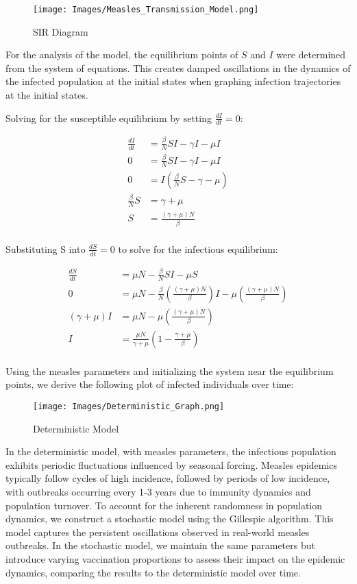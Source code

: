 \documentclass[12pt]{article}
\begin{document}
\begin{figure}[H]
  \centering
  \texttt{[image: Images/Measles\_Transmission\_Model.png]}
   \caption{SIR Diagram} 
\label{fig:example}
\end{figure}

For the analysis of the model, the equilibrium points of \(S\) and \(I\) were determined from the system of equations. This creates damped oscillations in the dynamics of the infected population at the initial states when graphing infection trajectories at the initial states. 

Solving for the susceptible equilibrium by setting \(\frac{dI}{dt} = 0\):

    \begin{align*}
      \frac{dI}{dt} &= \frac{\beta}{N} SI - \gamma I - \mu I \\ 
      0 &= \frac{\beta}{N} SI - \gamma I - \mu I \\ 
      0 &= I( \frac{\beta}{N} S - \gamma - \mu ) \\ 
       \frac{\beta}{N} S &=  \gamma + \mu\\ 
       S &=  \frac{(\gamma + \mu)N}{\beta} \\
    \end{align*}
    
Substituting S into \(\frac{dS}{dt} = 0\) to solve for the infectious equilibrium:
	
	\begin{align*}
	\frac{dS}{dt} &= \mu N -\frac{\beta}{N} SI - \mu S \\ 
	0 &= \mu N -\frac{\beta}{N} (\frac{(\gamma + \mu)N}{\beta} )I - \mu (\frac{(\gamma + \mu)N}{\beta} ) \\ 
	(\gamma + \mu)I  &= \mu N - \mu (\frac{(\gamma + \mu)N}{\beta} )\\ 
	I &= \frac{\mu N}{\gamma + \mu} (1 - \frac{\gamma + \mu}{\beta}) \\
	\end{align*}
	
\indent Using the measles parameters and initializing the system near the equilibrium points, we derive the following plot of infected individuals over time:

\begin{figure}[H]
  \centering
  \texttt{[image: Images/Deterministic\_Graph.png]}
   \caption{Deterministic Model} 
\label{fig:example}
\end{figure}

\indent In the deterministic model, with measles parameters, the infectious population exhibits periodic fluctuations influenced by seasonal forcing. Measles epidemics typically follow cycles of high incidence, followed by periods of low incidence, with outbreaks occurring every 1-3 years due to immunity dynamics and population turnover. To account for the inherent randomness in population dynamics, we construct a stochastic model using the Gillespie algorithm. This model captures the persistent oscillations observed in real-world measles outbreaks. In the stochastic model, we maintain the same parameters but introduce varying vaccination proportions to assess their impact on the epidemic dynamics, comparing the results to the deterministic model over time. 
    
\end{document}
